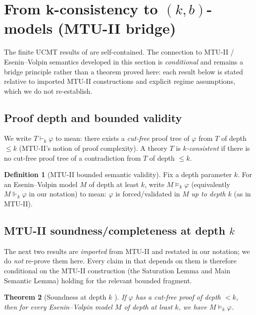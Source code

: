 \documentclass[11pt]{article}
\theoremstyle{definition}
\newtheorem{definition}{Definition}[section]
\theoremstyle{plain}
\newtheorem{theorem}[definition]{Theorem}
\begin{document}
\section{From k-consistency to $(k,b)$-models (MTU-II bridge)}
\label{sec:kcons-bridge}

The finite UCMT results of  are self-contained. The connection to
MTU-II / Esenin--Volpin semantics developed in this section is \emph{conditional} and
remains a bridge principle rather than a theorem proved here: each result below is stated
relative to imported MTU-II constructions and explicit regime assumptions, which we do not
re-establish.

\subsection{Proof depth and bounded validity}

We write $T \vdash_k \varphi$ to mean: there exists a \emph{cut-free} proof tree of $\varphi$
from $T$ of depth $\le k$ (MTU-II's notion of proof complexity).
A theory $T$ is \emph{$k$-consistent} if there is no cut-free proof tree of a contradiction
from $T$ of depth $\le k$.

\begin{definition}[MTU-II bounded semantic validity]
Fix a depth parameter $k$. For an Esenin--Volpin model $M$ of depth at least $k$, write
$M \models_k \varphi$ (equivalently $M \Vdash_k \varphi$ in our notation) to mean:
$\varphi$ is forced/validated in $M$ \emph{up to depth $k$} (as in MTU-II).
\end{definition}

\subsection{MTU-II soundness/completeness at depth $k$}

The next two results are \emph{imported} from MTU-II \cite{Mannucci2023MTU2} and restated in our
notation; we do \emph{not} re-prove them here. Every claim in  that depends
on them is therefore conditional on the MTU-II construction (the Saturation Lemma and Main Semantic
Lemma) holding for the relevant bounded fragment.

\begin{theorem}[Soundness at depth $k$ {\cite{Mannucci2023MTU2}}]
\label{thm:mtu-soundness}
If $\varphi$ has a cut-free proof of depth $< k$, then for every Esenin--Volpin model $M$
of depth at least $k$, we have $M \models_k \varphi$.
\end{theorem}
\end{document}
